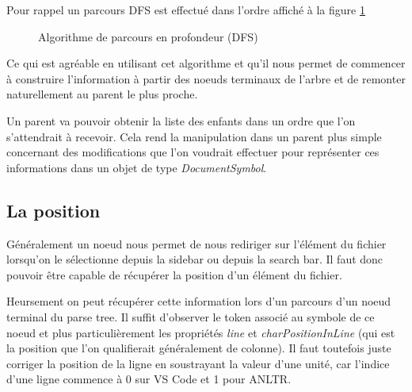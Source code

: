 \documentclass[
    iict, %
    il, %
]{heig-tb}
\begin{document}
Pour rappel un parcours DFS est effectué dans l'ordre affiché à la figure \ref*{Algorithme de parcours en profondeur (DFS)}

\begin{figure}[!h]
    \begin{center}
    \end{center}
    \caption[Algorithme de parcours en profondeur (DFS)]{\label{Algorithme de parcours en profondeur (DFS)} Algorithme de parcours en profondeur (DFS)}
\end{figure}

Ce qui est agréable en utilisant cet algorithme et qu'il nous permet de commencer à construire l'information à partir des noeuds terminaux
de l'arbre et de remonter naturellement au parent le plus proche.

Un parent va pouvoir obtenir la liste des enfants dans un ordre que l'on s'attendrait à recevoir.
Cela rend la manipulation dans un parent plus simple concernant des modifications que l'on voudrait effectuer pour représenter ces informations
dans un objet de type \emph{DocumentSymbol}.

\subsection{La position}

Généralement un noeud nous permet de nous rediriger sur l'élément du fichier lorsqu'on le sélectionne depuis la sidebar ou depuis la search bar.
Il faut donc pouvoir être capable de récupérer la position d'un élément du fichier.

Heursement on peut récupérer cette information lors d'un parcours d'un noeud terminal du parse tree.
Il suffit d'observer le token associé au symbole de ce noeud et plus particulièrement les
propriétés \emph{line} et \emph{charPositionInLine} (qui est la position que l'on qualifierait généralement de colonne).
Il faut toutefois juste corriger la position de la ligne en soustrayant la valeur d'une unité, car l'indice d'une ligne commence à 0 sur VS Code et 1 pour ANLTR.
\end{document}
